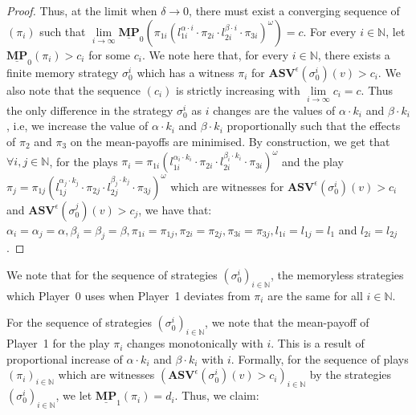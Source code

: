 \begin{proof}
    Thus, at the limit when $\delta \to 0$, there must exist a converging sequence of $(\pi_i)$  such that $\lim \limits_{i \to \infty} \underline{\mathbf{MP}}_0(\pi_{1i}(l^{\alpha \cdot i}_{1i} \cdot \pi_{2i} \cdot l^{\beta \cdot i}_{2i} \cdot \pi_{3i})^{\omega}) = c$. For every $i \in \mathbb{N}$, let $\underline{\mathbf{MP}}_0(\pi_i) > c_i$ for some $c_i$. We note here that, for every $i \in \mathbb{N}$, there exists a finite memory strategy $\sigma_0^i$ which has a witness $\pi_i$ for $ \mathbf{ASV}^{\epsilon}(\sigma_0^i)(v) > c_i$. We also note that the sequence $(c_i)$ is strictly increasing with $\lim \limits_{i \to \infty} c_i = c$. Thus the only difference in the strategy $\sigma_0^i$ as $i$ changes are the values of $\alpha \cdot k_i$ and $\beta \cdot k_i$, i.e, we increase the value of $\alpha \cdot k_i$ and $\beta \cdot k_i$ proportionally such that the effects of $\pi_2$ and $\pi_3$ on the mean-payoffs are minimised. By construction, we get that $\forall i, j \in \mathbb{N}$, for the plays $\pi_i= \pi_{1i}(l^{\alpha_i \cdot k_i}_{1i} \cdot \pi_{2i} \cdot l^{\beta_i \cdot k_i}_{2i} \cdot \pi_{3i})^{\omega}$ and the play $\pi_j= \pi_{1j}(l^{\alpha_j \cdot k_j}_{1j} \cdot \pi_{2j} \cdot l^{\beta_j \cdot k_j}_{2j} \cdot \pi_{3j})^{\omega}$ which are witnesses for $ \mathbf{ASV}^{\epsilon}(\sigma_0^i)(v) > c_i$ and $ \mathbf{ASV}^{\epsilon}(\sigma_0^j)(v) > c_j$, we have that:
    $\alpha_i = \alpha_j = \alpha, \beta_i = \beta_j = \beta, \pi_{1i} = \pi_{1j}, \pi_{2i} = \pi_{2j}, \pi_{3i} = \pi_{3j}, l_{1i} = l_{1j} = l_1$ and $l_{2i} = l_{2j}$.
\end{proof}

\begin{remark} 
    \label{RemarkStratEqual} 
    We note that for the sequence of strategies $(\sigma_0^i)_{i \in \mathbb{N}}$, the memoryless strategies which Player~0 uses when Player~1 deviates from $\pi_i$ are the same for all $i \in \mathbb{N}$.
\end{remark}

For the sequence of strategies $(\sigma_0^i)_{i \in \mathbb{N}}$, we note that the mean-payoff of Player~1 for the play $\pi_i$ changes monotonically with $i$. This is a result of proportional increase of $\alpha \cdot k_i$ and $\beta \cdot k_i$ with $i$. Formally, for the sequence of plays $(\pi_i)_{i \in \mathbb{N}}$ which are witnesses $(\mathbf{ASV}^{\epsilon}(\sigma_0^i)(v) > c_i)_{i \in \mathbb{N}}$ by the strategies $(\sigma_0^i)_{i \in \mathbb{N}}$, we let $\underline{\mathbf{MP}}_1(\pi_i) = d_i$. Thus, we claim:

